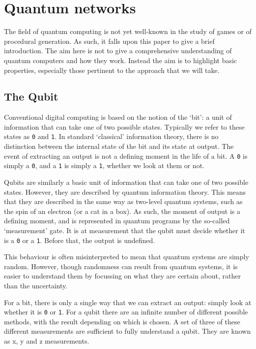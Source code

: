 \documentclass[conference]{IEEEtran}
\begin{document}
\section{Quantum networks}

The field of quantum computing is not yet well-known in the study of games or of procedural generation. As such, it falls upon this paper to give a brief introduction. The aim here is not to give a comprehensive understanding of quantum computers and how they work. Instead the aim is to highlight basic properties, especially those pertinent to the approach that we will take.


\subsection{The Qubit}

Conventional digital computing is based on the notion of the `bit': a unit of information that can take one of two possible states. Typically we refer to these states as \texttt{0} and \texttt{1}. In standard `classical' information theory, there is no distinction between the internal state of the bit and its state at output. The event of extracting an output is not a defining moment in the life of a bit. A \texttt{0} is simply a \texttt{0}, and a \texttt{1} is simply a \texttt{1}, whether we look at them or not.

Qubits are similarly a basic unit of information that can take one of two possible states. However, they are described by quantum information theory. This means that they are described in the same way as two-level quantum systems, such as the spin of an electron (or a cat in a box). As such, the moment of output is a defining moment, and is represented in quantum programs by the so-called `measurement' gate. It is at measurement that the qubit must decide whether it is a \texttt{0} or a \texttt{1}. Before that, the output is undefined.

This behaviour is often misinterpreted to mean that quantum systems are simply random. However, though randomness can result from quantum systems, it is easier to understand them by focussing on what they are certain about, rather than the uncertainty.

For a bit, there is only a single way that we can extract an output: simply look at whether it is \texttt{0} or \texttt{1}. For a qubit there are an infinite number of different possible methods, with the result depending on which is chosen. A set of three of these different measurements are sufficient to fully understand a qubit. They are known as x, y and z measurements.
\end{document}
